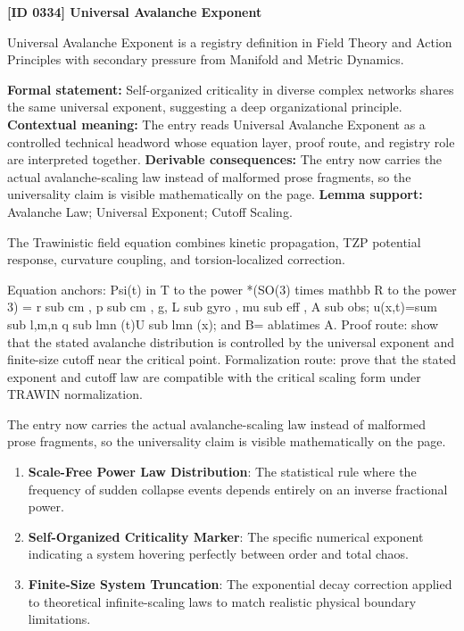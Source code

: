 \clearpage
\noindent\textbf{[ID 0334] Universal Avalanche Exponent}\par
\vspace{0.35em}
\begingroup\small
{}
Universal Avalanche Exponent is a registry definition in Field Theory and Action Principles with secondary pressure from Manifold and Metric Dynamics.

\begingroup\footnotesize\setlength{\emergencystretch}{3em}\sloppy
\textbf{Formal statement:} Self-organized criticality in diverse complex networks shares the same universal exponent, suggesting a deep organizational principle. \textbf{Contextual meaning:} The entry reads Universal Avalanche Exponent as a controlled technical headword whose equation layer, proof route, and registry role are interpreted together. \textbf{Derivable consequences:} The entry now carries the actual avalanche-scaling law instead of malformed prose fragments, so the universality claim is visible mathematically on the page. \textbf{Lemma support:} Avalanche Law; Universal Exponent; Cutoff Scaling.\par
\endgroup

The Trawinistic field equation combines kinetic propagation, TZP potential response, curvature coupling, and torsion-localized correction.

Equation anchors: Psi(t) in T to the power *(SO(3) times mathbb R to the power 3) = r sub cm , p sub cm , g, L sub gyro , mu sub eff , A sub obs; u(x,t)=sum sub l,m,n q sub lmn (t)U sub lmn (x); and B= ablatimes A. Proof route: show that the stated avalanche distribution is controlled by the universal exponent and finite-size cutoff near the critical point. Formalization route: prove that the stated exponent and cutoff law are compatible with the critical scaling form under TRAWIN normalization.

The entry now carries the actual avalanche-scaling law instead of malformed prose fragments, so the universality claim is visible mathematically on the page.
\endgroup

\begin{enumerate}[leftmargin=1.6em,itemsep=6pt,topsep=4pt]
\item \textbf{Scale-Free Power Law Distribution}: The statistical rule where the frequency of sudden collapse events depends entirely on an inverse fractional power.
\item \textbf{Self-Organized Criticality Marker}: The specific numerical exponent indicating a system hovering perfectly between order and total chaos.
\item \textbf{Finite-Size System Truncation}: The exponential decay correction applied to theoretical infinite-scaling laws to match realistic physical boundary limitations.
\end{enumerate}

